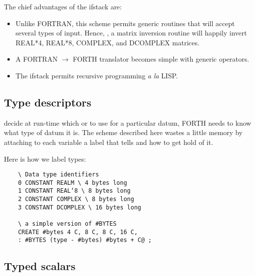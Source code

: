 The chief advantages of the ifstack are:
\begin{itemize}
    \item Unlike FORTRAN, this scheme permits generic routines that will accept several types of input. Hence, \eg, a matrix inversion routine will happily invert REAL*4, REAL*8, COMPLEX, and DCOMPLEX matrices.
    \item A FORTRAN $\rightarrow$ FORTH translator becomes simple with generic operators.
    \item The ifstack permits recursive programming \textit{a la} LISP.
\end{itemize}

\subsection{Type descriptors}
 decide at run-time which  or \regc{!} to use for a particular datum, FORTH needs to know what type of datum it is. The scheme described here wastes a little memory by attaching to each variable a label that tells  and  how to get hold of it.

Here is how we label types:
\begin{lstlisting}
    \ Data type identifiers
    0 CONSTANT REALM \ 4 bytes long
    1 CONSTANT REAL‘8 \ 8 bytes long
    2 CONSTANT COMPLEX \ 8 bytes long
    3 CONSTANT DCOMPLEX \ 16 bytes long

    \ a simple version of #BYTES
    CREATE #bytes 4 C, 8 C, 8 C, 16 C,
    : #BYTES (type - #bytes) #bytes + C@ ;
\end{lstlisting}

\subsection{Typed scalars}

